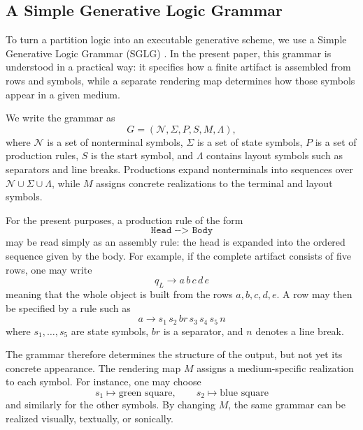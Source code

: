 \documentclass[
  10pt,
  twocolumn,
  aps,
  pra,
  showkeys,
  amsmath,amssymb,
  longbibliography
]{revtex4-2}
\begin{document}
\subsection{A Simple Generative Logic Grammar}

To turn a partition logic into an executable generative scheme, we use a Simple Generative Logic Grammar (SGLG) \cite{Jendreiko2025}. In the present paper, this grammar is understood in a practical way: it specifies how a finite artifact is assembled from rows and symbols, while a separate rendering map determines how those symbols appear in a given medium.

We write the grammar as
\begin{equation}
G=(\mathcal N,\Sigma,P,S,M,\Lambda),
\end{equation}
where \(\mathcal N\) is a set of nonterminal symbols, \(\Sigma\) is a set of state symbols, \(P\) is a set of production rules, \(S\) is the start symbol, and \(\Lambda\) contains layout symbols such as separators and line breaks. Productions expand nonterminals into sequences over \(\mathcal N\cup\Sigma\cup\Lambda\), while \(M\) assigns concrete realizations to the terminal and layout symbols.

For the present purposes, a production rule of the form
\begin{equation}
\texttt{Head -{}-> Body}
\end{equation}
may be read simply as an assembly rule: the head is expanded into the ordered sequence given by the body. For example, if the complete artifact consists of five rows, one may write
\begin{equation}
q_L \to a\,b\,c\,d\,e
\end{equation}
meaning that the whole object is built from the rows \(a,b,c,d,e\). A row may then be specified by a rule such as
\begin{equation}
a \to s_1\,s_2\,br\,s_3\,s_4\,s_5\,n
\end{equation}
where \(s_1,\dots,s_5\) are state symbols, \(br\) is a separator, and \(n\) denotes a line break.

The grammar therefore determines the structure of the output, but not yet its concrete appearance. The rendering map \(M\) assigns a medium-specific realization to each symbol. For instance, one may choose
\begin{equation}
s_1 \mapsto \text{green square},
\qquad
s_2 \mapsto \text{blue square}
\end{equation}
and similarly for the other symbols. By changing \(M\), the same grammar can be realized visually, textually, or sonically.
\end{document}
